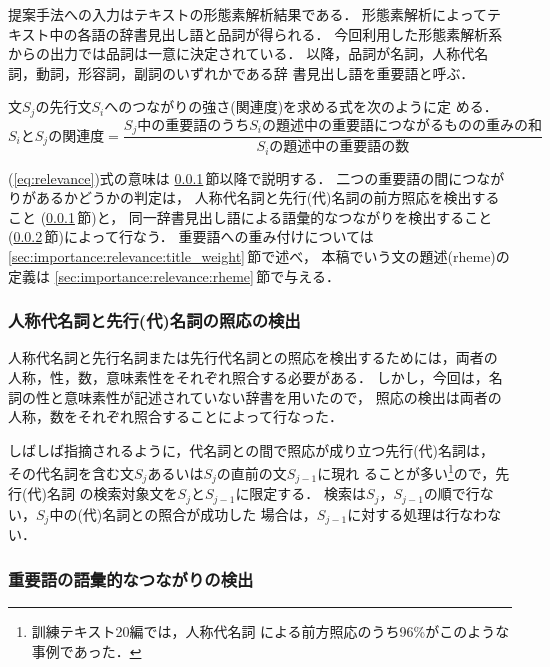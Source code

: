 提案手法への入力はテキストの形態素解析結果である．
形態素解析によってテキスト中の各語の辞書見出し語と品詞が得られる．
今回利用した形態素解析系からの出力では品詞は一意に決定されている．
以降，品詞が名詞，人称代名詞，動詞，形容詞，副詞のいずれかである辞
書見出し語を重要語と呼ぶ．

文$S_j$の先行文$S_i$へのつながりの強さ(関連度)を求める式を次のように定
める．
\begin{equation}
S_iとS_jの関連度 = \frac{S_j中の重要語のうちS_iの題述中の重要語につ
ながるものの重みの和}{S_iの題述中の重要語の数}
\label{eq:relevance}
\end{equation}

(\ref{eq:relevance})式の意味は
\ref{sec:importance:relevance:anaphora}\,節以降で説明する．
二つの重要語の間につながりがあるかどうかの判定は，
人称代名詞と先行(代)名詞の前方照応を検出すること
(\ref{sec:importance:relevance:anaphora}\,節)と，
同一辞書見出し語による語彙的なつながりを検出すること
(\ref{sec:importance:relevance:lexical}\,節)によって行なう．
重要語への重み付けについては
\ref{sec:importance:relevance:title_weight}\,節で述べ，
本稿でいう文の題述(rheme)の定義は
\ref{sec:importance:relevance:rheme}\,節で与える．

\vspace{-1mm}
\subsubsection{人称代名詞と先行(代)名詞の照応の検出}
\label{sec:importance:relevance:anaphora}
\vspace{-1mm}

人称代名詞と先行名詞または先行代名詞との照応を検出するためには，両者の
人称，性，数，意味素性をそれぞれ照合する必要がある．
しかし，今回は，名詞の性と意味素性が記述されていない辞書を用いたので，
照応の検出は両者の人称，数をそれぞれ照合することによって行なった．

しばしば指摘されるように，代名詞との間で照応が成り立つ先行(代)名詞は，
その代名詞を含む文$S_j$あるいは$S_j$の直前の文$S_{j-1}$に現れ
ることが多い\footnote{訓練テキスト20編では，人称代名詞
による前方照応のうち96\%がこのような事例であった．}ので，先行(代)名詞
の検索対象文を$S_j$と$S_{j-1}$に限定する．
検索は$S_j$，$S_{j-1}$の順で行ない，$S_j$中の(代)名詞との照合が成功した
場合は，$S_{j-1}$に対する処理は行なわない．

\vspace{-1mm}
\subsubsection{重要語の語彙的なつながりの検出}
\label{sec:importance:relevance:lexical}
\vspace{-1mm}

